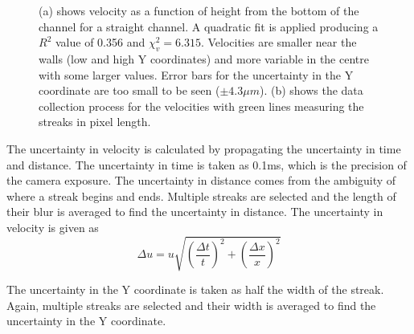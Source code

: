 \documentclass[12pt]{article}
\begin{document}
\begin{figure}[H]
    \centering
    \qquad
    \caption{(a) shows velocity as a function of height from the bottom of the channel for a straight channel. A quadratic fit is applied producing a $R^2$ value of 0.356 and $\chi_v^2=6.315$.
    Velocities are smaller near the walls (low and high Y coordinates) and more variable in the centre with some larger values. Error bars for the uncertainty in the Y coordinate are too small to be seen ($\pm 4.3 \mu m$).
    (b) shows the data collection process for the velocities with green lines measuring the streaks in pixel length.}
    \label{fig:straight_channel}
\end{figure}

The uncertainty in velocity is calculated by propagating the uncertainty in time and distance. The uncertainty in time is taken as 0.1ms, which is the precision of the camera exposure.
The uncertainty in distance comes from the ambiguity of where a streak begins and ends. Multiple streaks are selected and the length of their blur is averaged to find the uncertainty in distance.
The uncertainty in velocity is given as $$\Delta u = u \sqrt{(\frac{\Delta t}{t})^2 + (\frac{\Delta x}{x})^2}$$

The uncertainty in the Y coordinate is taken as half the width of the streak. Again, multiple streaks are selected and their width is averaged to find the uncertainty in the Y coordinate.
\end{document}
